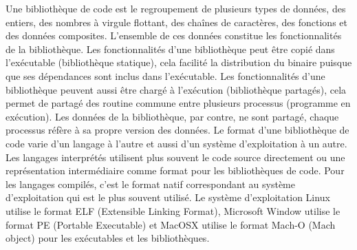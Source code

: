\documentclass[12pt,initial,twoside,maitrise]{dms}
\numberwithin{equation}{section}
\numberwithin{table}{chapter}
\numberwithin{figure}{chapter}
\begin{document}
\NoChapterPageNumber%


%








\newpage



Une bibliothèque de code est le regroupement de plusieurs types
de données, des entiers, des nombres à virgule flottant, des chaînes
de caractères, des fonctions et des données composites. L'ensemble
de ces données constitue les fonctionnalités de la bibliothèque.
Les fonctionnalités d'une bibliothèque peut être copié dans l'exécutable
(bibliothèque statique), cela facilité la distribution du binaire puisque
que ses dépendances sont inclus dans l'exécutable.
Les fonctionnalités d'une bibliothèque peuvent aussi être chargé
à l'exécution (bibliothèque partagés), cela permet de partagé des routine
commune entre plusieurs processus (programme en exécution). Les données de
la bibliothèque, par contre, ne sont partagé, chaque processus réfère à
sa propre version des données.
Le format d'une bibliothèque de code varie d'un langage à l'autre et aussi d'un
système d'exploitation à un autre. Les langages interprétés utilisent plus
souvent le code source directement ou une représentation intermédiaire comme format pour
les bibliothèques de code.
Pour les langages compilés, c'est le format natif correspondant au système d'exploitation
qui est le plus souvent utilisé. Le système d'exploitation Linux utilise le
format ELF (Extensible Linking Format), Microsoft Window utilise le format PE (Portable Executable)
et MacOSX utilise le format Mach-O (Mach object) pour les exécutables et les bibliothèques.
\end{document}
